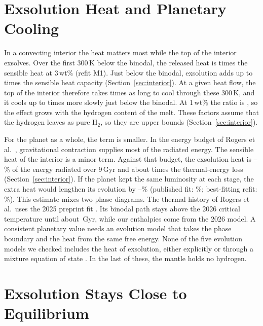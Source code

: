 \section{Exsolution Heat and Planetary Cooling}\label{sec:cooling_discussion}

In a convecting interior the heat matters most while the top of the interior exsolves. Over the
first 300\,K below the binodal, the released heat is \intRatioThree{} times the sensible heat at
3\,wt\% (refit M1). Just below the binodal, exsolution adds up to \intGammaThree{} times the
sensible heat capacity (Section~\ref{sec:interior}). At a given heat flow, the top of the
interior therefore takes \intSlowThree{} times as long to cool through these 300\,K, and it
cools up to \intCeffThree{} times more slowly just below the binodal. At 1\,wt\% the ratio is
\intRatioOne{}, so the effect grows with the hydrogen content of the melt. These factors assume
that the hydrogen leaves as pure H$_2$, so they are upper bounds (Section~\ref{sec:interior}).

For the planet as a whole, the term is smaller. In the energy budget of Rogers et al.\
\cite{rogers2025}, gravitational contraction supplies most of the radiated energy. The sensible
heat of the interior is a minor term. Against that budget, the exsolution heat is
\planetRadiatedLo{}--\planetRadiatedHi{}\% of the energy radiated over 9\,Gyr and about
\planetThermal{} times the thermal-energy loss (Section~\ref{sec:interior}). If the planet kept
the same luminosity at each stage, the extra heat would lengthen its evolution by
\planetDelayLo{}--\planetDelayHi{}\% (published fit: \planetDelayPub{}\%; best-fitting refit:
\planetDelayMap{}\%). This estimate mixes two phase diagrams. The thermal history of Rogers et
al.\ uses the 2025 preprint fit \cite{stixrude2025}. Its binodal path stays above the 2026
critical temperature until about \planetCrossPubGyr{}\,Gyr, while our enthalpies come from the
2026 model. A consistent planetary
value needs an evolution model that takes the phase boundary and the heat from the same free
energy. None of the five evolution models we checked includes the heat of exsolution, either
explicitly or through a mixture equation of state
\cite{rogers2025,rogers2026,young2026,tang2026,tejada2026}. In the last of these, the mantle
holds no hydrogen.

\section{Exsolution Stays Close to Equilibrium}\label{sec:near_equilibrium}

